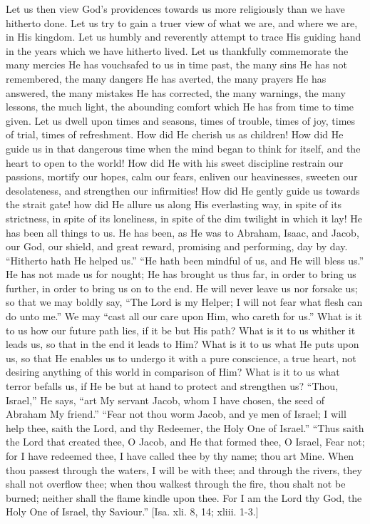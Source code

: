 Let us then view God's providences towards us more religiously than
we have hitherto done. Let us try to gain a truer view of what we are,
and where we are, in His kingdom. Let us humbly and reverently attempt
to trace His guiding hand in the years which we have hitherto lived.
Let us thankfully commemorate the many mercies He has vouchsafed to us
in time past, the many sins He has not remembered, the many dangers He
has averted, the many prayers He has answered, the many mistakes He
has corrected, the many warnings, the many lessons, the much light,
the abounding comfort which He has from time to time given. Let us
dwell upon times and seasons, times of trouble, times of joy, times of
trial, times of refreshment. How did He cherish us as children! How
did He guide us in that dangerous time when the mind began to think
for itself, and the heart to open to the world! How did He with his
sweet discipline restrain our passions, mortify our hopes, calm our
fears, enliven our heavinesses, sweeten our desolateness, and
strengthen our infirmities! How did He gently guide us towards the
strait gate! how did He allure us along His everlasting way, in spite
of its strictness, in spite of its loneliness, in spite of the dim
twilight in which it lay! He has been all things to us. He has been,
as He was to Abraham, Isaac, and Jacob, our God, our shield, and great
reward, promising and performing, day by day. ``Hitherto hath He
helped us.'' ``He hath been mindful of us, and He will bless
us.'' He has not made us for nought; He has brought us thus far,
in order to bring us further, in order to bring us on to the end. He
will never leave us nor forsake us; so that we may boldly say,
``The Lord is my Helper; I will not fear what flesh can do unto
me.'' We may ``cast all our care upon Him, who careth for
us.'' What is it to us how our future path lies, if it be but His
path? What is it to us whither it leads us, so that in the end it
leads to Him? What is it to us what He puts upon us, so that He
enables us to undergo it with a pure conscience, a true heart, not
desiring anything of this world in comparison of Him? What is it to us
what terror befalls us, if He be but at hand to protect and strengthen
us? ``Thou, Israel,'' He says, ``art My servant Jacob,
whom I have chosen, the seed of Abraham My friend.'' ``Fear
not thou worm Jacob, and ye men of Israel; I will help thee, saith the
Lord, and thy Redeemer, the Holy One of Israel.'' ``Thus saith
the Lord that created thee, O Jacob, and He that formed thee, O
Israel, Fear not; for I have redeemed thee, I have called thee by thy
name; thou art Mine. When thou passest through the waters, I will be
with thee; and through the rivers, they shall not overflow thee; when
thou walkest through the fire, thou shalt not be burned; neither shall
the flame kindle upon thee. For I am the Lord thy God, the Holy One of
Israel, thy Saviour.'' [Isa. xli. 8, 14; xliii. 1-3.]

